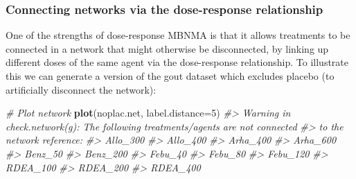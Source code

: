 \documentclass[]{article}
\newenvironment{Shaded}{\begin{snugshade}}{\end{snugshade}}
\newcommand{\CommentTok}[1]{\textcolor[rgb]{0.56,0.35,0.01}{\textit{#1}}}
\newcommand{\DataTypeTok}[1]{\textcolor[rgb]{0.13,0.29,0.53}{#1}}
\newcommand{\DecValTok}[1]{\textcolor[rgb]{0.00,0.00,0.81}{#1}}
\newcommand{\KeywordTok}[1]{\textcolor[rgb]{0.13,0.29,0.53}{\textbf{#1}}}
\newcommand{\NormalTok}[1]{#1}
\newcommand{\OperatorTok}[1]{\textcolor[rgb]{0.81,0.36,0.00}{\textbf{#1}}}
\newcommand{\StringTok}[1]{\textcolor[rgb]{0.31,0.60,0.02}{#1}}
\begin{document}
\hypertarget{connecting-networks-via-the-dose-response-relationship}{%
\subsubsection{Connecting networks via the dose-response
relationship}\label{connecting-networks-via-the-dose-response-relationship}}

One of the strengths of dose-response MBNMA is that it allows treatments
to be connected in a network that might otherwise be disconnected, by
linking up different doses of the same agent via the dose-response
relationship. To illustrate this we can generate a version of the gout
dataset which excludes placebo (to artificially disconnect the network):

\begin{Shaded}
\end{Shaded}

\begin{Shaded}
\begin{Highlighting}[]
\CommentTok{# Plot network}
\KeywordTok{plot}\NormalTok{(noplac.net, }\DataTypeTok{label.distance=}\DecValTok{5}\NormalTok{)}
\CommentTok{#> Warning in check.network(g): The following treatments/agents are not connected}
\CommentTok{#> to the network reference:}
\CommentTok{#> Allo_300}
\CommentTok{#> Allo_400}
\CommentTok{#> Arha_400}
\CommentTok{#> Arha_600}
\CommentTok{#> Benz_50}
\CommentTok{#> Benz_200}
\CommentTok{#> Febu_40}
\CommentTok{#> Febu_80}
\CommentTok{#> Febu_120}
\CommentTok{#> RDEA_100}
\CommentTok{#> RDEA_200}
\CommentTok{#> RDEA_400}
\end{Highlighting}
\end{Shaded}
\end{document}
